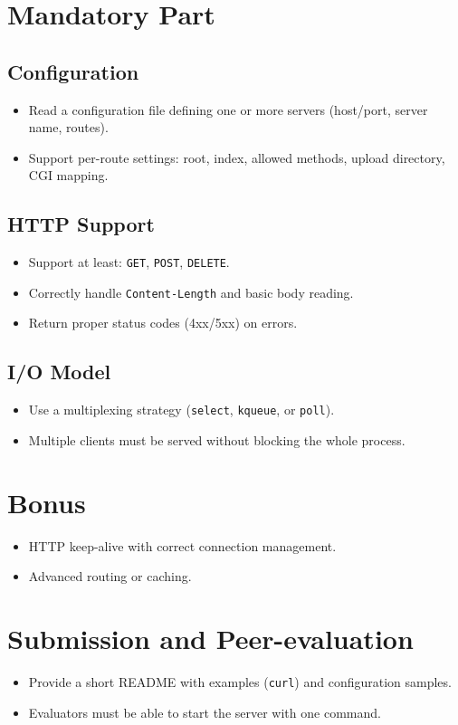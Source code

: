 \documentclass[11pt]{article}
\begin{document}
\section{Mandatory Part}
\subsection{Configuration}
\begin{itemize}
  \item Read a configuration file defining one or more servers (host/port, server name, routes).
  \item Support per-route settings: root, index, allowed methods, upload directory, CGI mapping.
\end{itemize}

\subsection{HTTP Support}
\begin{itemize}
  \item Support at least: \texttt{GET}, \texttt{POST}, \texttt{DELETE}.
  \item Correctly handle \texttt{Content-Length} and basic body reading.
  \item Return proper status codes (4xx/5xx) on errors.
\end{itemize}

\subsection{I/O Model}
\begin{itemize}
  \item Use a multiplexing strategy (\texttt{select}, \texttt{kqueue}, or \texttt{poll}).
  \item Multiple clients must be served without blocking the whole process.
\end{itemize}

\section{Bonus}
\begin{itemize}
  \item HTTP keep-alive with correct connection management.
  \item Advanced routing or caching.
\end{itemize}

\section{Submission and Peer-evaluation}
\begin{itemize}
  \item Provide a short README with examples (\texttt{curl}) and configuration samples.
  \item Evaluators must be able to start the server with one command.
\end{itemize}
\end{document}
